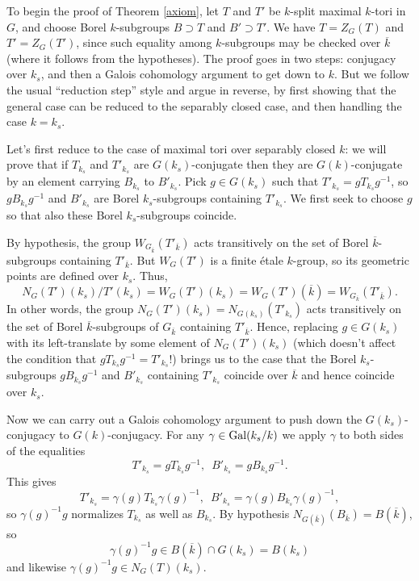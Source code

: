 \documentclass[10pt]{article}
\renewcommand{\(}{\left(}
\renewcommand{\)}{\right)}
\numberwithin{thm}{subsection}
\begin{document}
To begin the proof of Theorem \ref{axiom}, 
let $T$ and $T'$ be $k$-split maximal $k$-tori in $G$, and choose
Borel $k$-subgroups $B \supset T$ and $B' \supset T'$.  We have $T = Z_G(T)$ and $T' = Z_G(T')$, 
since such equality among $k$-subgroups may be checked over $\overline{k}$
(where it follows from the hypotheses).   
The proof goes in two steps:  conjugacy over $k_s$, and then a Galois cohomology argument to
get down to $k$.  But we follow the usual ``reduction step'' style and argue in reverse,
by first showing that the general case can be reduced to the separably closed case,
and then handling the case $k = k_s$. 

Let's first reduce to the case of  maximal tori over separably closed $k$:  we will prove that if
$T_{k_s}$ and $T'_{k_s}$ are $G(k_s)$-conjugate then they are $G(k)$-conjugate by an element carrying $B_{k_s}$ to $B'_{k_s}$.
Pick $g \in G(k_s)$ such that $T'_{k_s} = g T_{k_s} g^{-1}$, so
$g B_{k_s} g^{-1}$ and $B'_{k_s}$ are Borel $k_s$-subgroups containing
$T'_{k_s}$.  We first seek to choose $g$ so that also these Borel $k_s$-subgroups coincide.

By hypothesis, the group $W_{G_{\overline{k}}}(T'_{\overline{k}})$ acts
transitively on the set of Borel $\overline{k}$-subgroups containing
$T'_{\overline{k}}$.  But $W_G(T')$ is a finite \'etale $k$-group, so its geometric points
are defined over $k_s$.  Thus, 
$$N_G(T')(k_s)/T'(k_s) = W_G(T')(k_s) = W_G(T')(\overline{k}) =W_{G_{\overline{k}}}(T'_{\overline{k}}).$$
In other words, the group $N_G(T')(k_s) = N_{G(k_s)}(T'_{k_s})$ acts
transitively on the set of Borel $\overline{k}$-subgroups of $G_{\overline{k}}$ containing $T'_{\overline{k}}$.
Hence, replacing $g \in G(k_s)$ with its left-translate by some element of $N_G(T')(k_s)$
(which doesn't affect the condition that $gT_{k_s} g^{-1} = T'_{k_s}$!)
brings us to the case that the Borel $k_s$-subgroups $gB_{k_s}g^{-1}$ and $B'_{k_s}$
containing $T'_{k_s}$ coincide over $\overline{k}$ and hence coincide over $k_s$.

Now we can carry out a Galois cohomology argument to push down
the $G(k_s)$-conjugacy to $G(k)$-conjugacy.
For any $\gamma \in {\rm{Gal}}(k_s/k)$ we apply $\gamma$ to both sides of the equalities
$$T'_{k_s} = g T_{k_s} g^{-1},\,\,\,B'_{k_s} = g B_{k_s} g^{-1}.$$
This gives 
$$T'_{k_s} = \gamma(g) T_{k_s} \gamma(g)^{-1},\,\,\,
B'_{k_s} = \gamma(g) B_{k_s} \gamma(g)^{-1},$$ 
so $\gamma(g)^{-1}g$ normalizes $T_{k_s}$ as well as $B_{k_s}$.
By hypothesis $N_{G(\overline{k})}(B_{\overline{k}}) = B(\overline{k})$,
so $$\gamma(g)^{-1}g \in B(\overline{k}) \cap G(k_s) = B(k_s)$$
and likewise $\gamma(g)^{-1}g \in N_G(T)(k_s)$.
\end{document}
